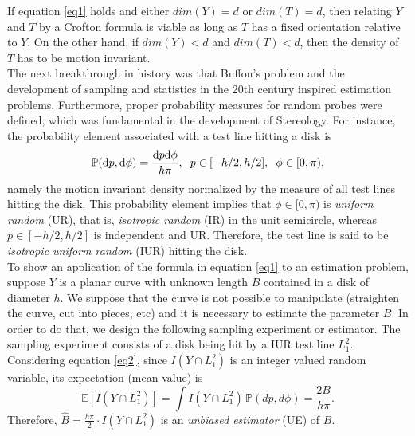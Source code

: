 If equation \eqref{eq1} holds and either $dim(Y)=d$ or $dim(T)=d$, then relating $Y$ and $T$ by a Crofton formula is viable as long as $T$ has a fixed orientation relative to $Y$. On the other hand, if $dim(Y)<d$ and $dim(T)<d$, then the density of $T$ has to be motion invariant.\\

The next breakthrough in history was that Buffon's problem and the development of sampling and statistics in the 20th century inspired estimation problems. Furthermore, proper probability measures for random probes were defined, which was fundamental in the development of Stereology. For instance, the probability element associated with a test line hitting a disk is $$ \mathbb{P}(\mathrm{d}p,\mathrm{d}\phi) = \frac{\mathrm{d}p\mathrm{d}\phi}{h\pi}, \hspace{2mm} p\in[-h/2,h/2], \hspace{2mm} \phi \in [0,\pi), $$
namely the motion invariant density normalized by the measure of all test lines hitting the disk. This probability element implies that $\phi \in [0,\pi)$ is \textit{uniform random} (UR), that is, \textit{isotropic random} (IR) in the unit semicircle, whereas $p \in [-h/2,h/2]$ is independent and UR. Therefore, the test line is said to be \textit{isotropic uniform random} (IUR) hitting the disk.\\

To show an application of the formula in equation \eqref{eq1} to an estimation problem, suppose $Y$ is a planar curve with unknown length $B$ contained in a disk of diameter $h$.  
We suppose that the curve is not possible to manipulate (straighten the curve, cut into pieces, etc) and it is necessary to estimate the parameter $B$.
In order to do that, we design the following sampling experiment or estimator.
The sampling experiment consists of a disk being hit by a IUR test line $L_1^2$. Considering equation \eqref{eq2}, since $I(Y\cap L_1^2)$ is an integer valued random variable, its expectation (mean value) is $$ \mathbb{E}[I(Y\cap L_1^2)] = \int  I(Y\cap L_1^2)\,\mathbb{P}(dp,d\phi) = \frac{2B}{h\pi}. $$
Therefore, $\widehat{B}=\frac{h\pi}{2} \cdot I(Y\cap L_1^2)$ is an \textit{unbiased estimator} (UE) of $B$.\\

